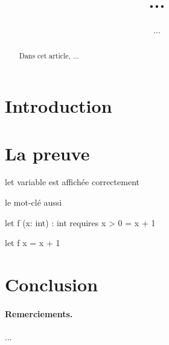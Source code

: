 \documentclass[a4paper]{easychair}
\begin{document}
\title{...}
\author{...}
\maketitle

\begin{abstract}
  Dans cet article, ...
\end{abstract}

\section{Introduction}

\cite{taocp}

\section{La preuve}

let variable  est affichée correctement

le mot-clé  aussi

\begin{why3}
  let f (x: int) : int
    requires { x > 0 }
  =
    x + 1
\end{why3}

\begin{ocaml}
  let f x = x + 1
\end{ocaml}

\section{Conclusion}
\label{sec:conclusion}


\paragraph{Remerciements.} ...



\end{document}
